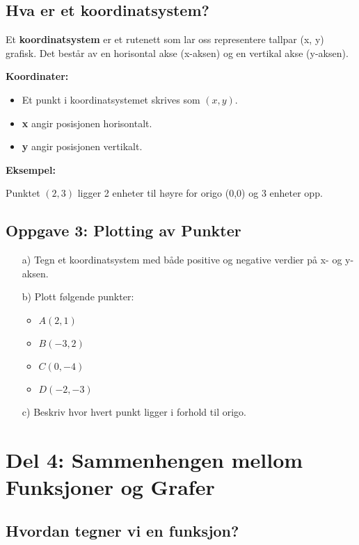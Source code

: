 \documentclass[12pt]{article}
\begin{document}
\subsection*{Hva er et koordinatsystem?}

Et \textbf{koordinatsystem} er et rutenett som lar oss representere tallpar (x, y) grafisk. Det består av en horisontal akse (x-aksen) og en vertikal akse (y-aksen).

\textbf{Koordinater:}

\begin{itemize}
    \item Et punkt i koordinatsystemet skrives som \( (x, y) \).
    \item \textbf{x} angir posisjonen horisontalt.
    \item \textbf{y} angir posisjonen vertikalt.
\end{itemize}

\textbf{Eksempel:}

Punktet \( (2, 3) \) ligger 2 enheter til høyre for origo (0,0) og 3 enheter opp.

\subsection*{Oppgave 3: Plotting av Punkter}

\begin{enumerate}
    \item[a)] Tegn et koordinatsystem med både positive og negative verdier på x- og y-aksen.
    \item[b)] Plott følgende punkter:
    \begin{itemize}
        \item \( A(2, 1) \)
        \item \( B(-3, 2) \)
        \item \( C(0, -4) \)
        \item \( D(-2, -3) \)
    \end{itemize}
    \item[c)] Beskriv hvor hvert punkt ligger i forhold til origo.
\end{enumerate}

\section*{Del 4: Sammenhengen mellom Funksjoner og Grafer}

\subsection*{Hvordan tegner vi en funksjon?}
\end{document}
